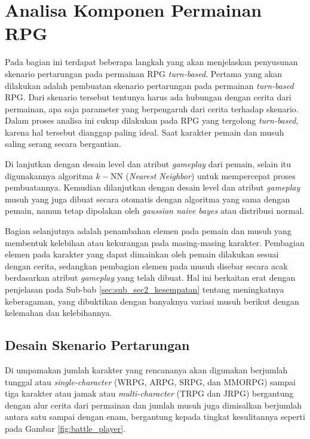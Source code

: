 \section{Analisa Komponen Permainan RPG}
\label{sec:sec3_design_komponen}
\vspace{1ex}

Pada bagian ini terdapat beberapa langkah yang akan menjelaskan penyusunan skenario pertarungan pada permainan RPG \textit{turn-based}. Pertama yang akan dilakukan adalah pembuatan skenario pertarungan pada permainan \textit{turn-based} RPG. Dari skenario tersebut tentunya harus ada hubungan dengan cerita dari permainan, apa saja parameter yang berpengaruh dari cerita terhadap skenario. Dalam proses analisa ini cukup dilakukan pada RPG yang tergolong \textit{turn-based}, karena hal tersebut dianggap paling ideal. Saat karakter pemain dan musuh saling serang secara bergantian.
\vspace{1ex}

Di lanjutkan dengan desain level dan atribut \textit{gameplay} dari pemain, selain itu digunakannya algoritma $k-$NN (\textit{Nearest Neighbor}) untuk mempercepat proses pembuatannya. Kemudian dilanjutkan dengan desain level dan atribut \textit{gameplay} musuh yang juga dibuat secara otomatis dengan algoritma yang sama dengan pemain, namun tetap dipolakan oleh \textit{gaussian naive bayes} atau distribusi normal. 
\vspace{1ex}

Bagian selanjutnya adalah penambahan elemen pada pemain dan musuh yang membentuk kelebihan atau kekurangan pada masing-masing karakter. Pembagian elemen pada karakter yang dapat dimainkan oleh pemain dilakukan sesuai dengan cerita, sedangkan pembagian elemen pada musuh disebar secara acak berdasarkan atribut \textit{gameplay} yang telah dibuat. Hal ini berkaitan erat dengan penjelasan pada Sub-bab \ref{sec:sub_sec2_kesempatan} tentang meningkatnya keberagaman, yang dibuktikan dengan banyaknya variasi musuh berikut dengan kelemahan dan kelebihannya.
\vspace{1ex}

\subsection{Desain Skenario Pertarungan}
\label{sec:sub_sec3_design_skenario}
\vspace{1ex}

Di umpamakan jumlah karakter yang rencananya akan digunakan berjumlah tunggal atau \textit{single-character} (WRPG, ARPG, SRPG, dan MMORPG) sampai tiga karakter atau jamak atau \textit{multi-character} (TRPG dan JRPG) bergantung dengan alur cerita dari permainan dan jumlah musuh juga dimisalkan berjumlah antara satu sampai dengan enam, bergantung kepada tingkat kesulitannya seperti pada Gambar \ref{fig:battle_player}. 
\vspace{1ex}

